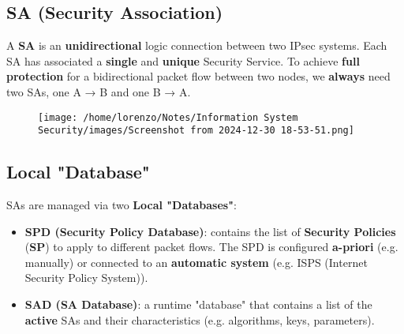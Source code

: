 \subsection{SA (Security Association)}
A \textbf{SA} is an \textbf{unidirectional} logic connection between two IPsec systems. Each SA has associated a \textbf{single} and \textbf{unique} Security Service. To achieve \textbf{full protection} for a bidirectional
packet flow between two nodes, we \textbf{always} need two SAs, one A → B and one B → A.
\begin{figure}[H]
    \centering
    \texttt{[image: /home/lorenzo/Notes/Information System Security/images/Screenshot from 2024-12-30 18-53-51.png]}
\end{figure}

\subsection{Local "Database"}
SAs are managed via two \textbf{Local "Databases"}:
\begin{itemize}
    \item \textbf{SPD (Security Policy Database)}: contains the list of \textbf{Security Policies} (\textbf{SP}) to apply to different packet flows.
    The SPD is configured \textbf{a-priori} (e.g. manually) or connected to an \textbf{automatic system} (e.g. ISPS (Internet Security Policy System)).
    \item \textbf{SAD (SA Database)}:  a runtime "database" that contains a list of the \textbf{active} SAs and their characteristics (e.g. algorithms, keys, parameters).
\end{itemize}

